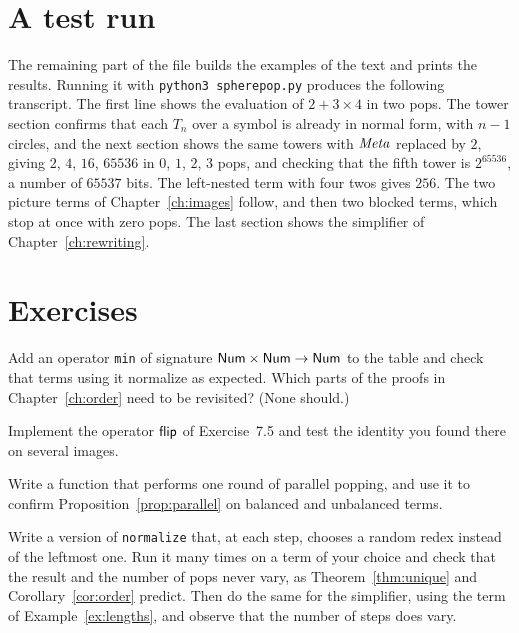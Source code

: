 

\section{A test run}

The remaining part of the file builds the examples of the text and prints the results. Running it with \texttt{python3 spherepop.py} produces the following transcript. The first line shows the evaluation of $2+3\times4$ in two pops. The tower section confirms that each $T_n$ over a symbol is already in normal form, with $n-1$ circles, and the next section shows the same towers with $\mathit{Meta}$ replaced by $2$, giving $2$, $4$, $16$, $65536$ in $0$, $1$, $2$, $3$ pops, and checking that the fifth tower is $2^{65536}$, a number of $65537$ bits. The left-nested term with four twos gives $256$. The two picture terms of Chapter~\ref{ch:images} follow, and then two blocked terms, which stop at once with zero pops. The last section shows the simplifier of Chapter~\ref{ch:rewriting}.



\section*{Exercises}

\begin{exercise}
Add an operator \texttt{min} of signature $\mathsf{Num}\times\mathsf{Num}\to\mathsf{Num}$ to the table and check that terms using it normalize as expected. Which parts of the proofs in Chapter~\ref{ch:order} need to be revisited? (None should.)
\end{exercise}

\begin{exercise}
Implement the operator $\mathsf{flip}$ of Exercise~7.5 and test the identity you found there on several images.
\end{exercise}

\begin{exercise}
Write a function that performs one round of parallel popping, and use it to confirm Proposition~\ref{prop:parallel} on balanced and unbalanced terms.
\end{exercise}

\begin{exercise}
Write a version of \texttt{normalize} that, at each step, chooses a random redex instead of the leftmost one. Run it many times on a term of your choice and check that the result and the number of pops never vary, as Theorem~\ref{thm:unique} and Corollary~\ref{cor:order} predict. Then do the same for the simplifier, using the term of Example~\ref{ex:lengths}, and observe that the number of steps does vary.
\end{exercise}
